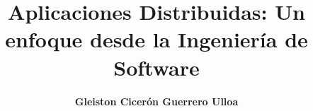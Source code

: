 \documentclass[12pt,a4paper,final]{book}
\begin{document}
	\baselineskip15pt
	
	\author{\textbf{\Large {Gleiston Cicerón Guerrero Ulloa}}}
	\title{Aplicaciones Distribuidas: Un enfoque desde la Ingeniería de Software}
	\date{}
	
	\maketitle
	
	\tableofcontents
	
	
	
	
	
	
	
	\clearpage
	
	\printglossary[type=\acronymtype]
	
	
	
\end{document}
